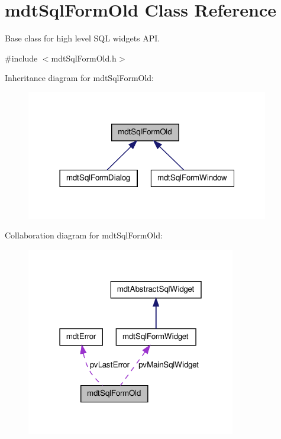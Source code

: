 \hypertarget{classmdt_sql_form_old}{
\section{mdtSqlFormOld Class Reference}
\label{classmdt_sql_form_old}
}


Base class for high level SQL widgets API.  




{\ttfamily \#include $<$mdtSqlFormOld.h$>$}



Inheritance diagram for mdtSqlFormOld:\nopagebreak
\begin{figure}[H]
\begin{center}
\leavevmode
\includegraphics[width=300pt]{classmdt_sql_form_old__inherit__graph}
\end{center}
\end{figure}


Collaboration diagram for mdtSqlFormOld:\nopagebreak
\begin{figure}[H]
\begin{center}
\leavevmode
\includegraphics[width=259pt]{classmdt_sql_form_old__coll__graph}
\end{center}
\end{figure}
